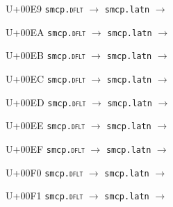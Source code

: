 \documentclass{article}
\begin{document}
\begin{substitutions}
\goodbreak

U+00E9  \linebreak
    \texttt{smcp.\textsc{dflt}} $\to$  \linebreak
    \texttt{smcp.latn} $\to$  

\goodbreak

U+00EA  \linebreak
    \texttt{smcp.\textsc{dflt}} $\to$  \linebreak
    \texttt{smcp.latn} $\to$  

\goodbreak

U+00EB  \linebreak
    \texttt{smcp.\textsc{dflt}} $\to$  \linebreak
    \texttt{smcp.latn} $\to$  

\goodbreak

U+00EC  \linebreak
    \texttt{smcp.\textsc{dflt}} $\to$  \linebreak
    \texttt{smcp.latn} $\to$  

\goodbreak

U+00ED  \linebreak
    \texttt{smcp.\textsc{dflt}} $\to$  \linebreak
    \texttt{smcp.latn} $\to$  

\goodbreak

U+00EE  \linebreak
    \texttt{smcp.\textsc{dflt}} $\to$  \linebreak
    \texttt{smcp.latn} $\to$  

\goodbreak

U+00EF  \linebreak
    \texttt{smcp.\textsc{dflt}} $\to$  \linebreak
    \texttt{smcp.latn} $\to$  

\goodbreak

U+00F0  \linebreak
    \texttt{smcp.\textsc{dflt}} $\to$  \linebreak
    \texttt{smcp.latn} $\to$  

\goodbreak

U+00F1  \linebreak
    \texttt{smcp.\textsc{dflt}} $\to$  \linebreak
    \texttt{smcp.latn} $\to$  


\end{substitutions}
\end{document}
